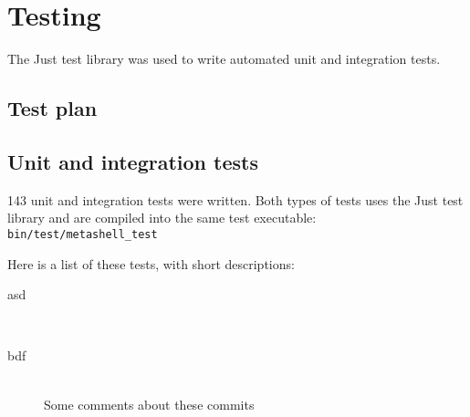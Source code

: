 
\chapter{Testing}

The Just\cite{just} test library was used to write automated unit and
integration tests.


\section{Test plan}


\section{Unit and integration tests}

143 unit and integration tests were written. Both types of tests uses the Just
test library and are compiled into the same test executable:
\verb$bin/test/metashell_test$

Here is a list of these tests, with short descriptions:

\begin{description}
    \item[asd] \hfill \\
    \item[bdf] \hfill \\
        Some comments about these commits
\end{description}

